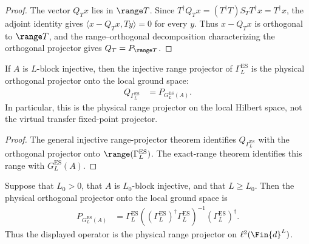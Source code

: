 \begin{proof}
    \leanok
    The vector $Q_Tx$ lies in $\range T$. Since
    $T^\dagger Q_Tx=(T^\dagger T)S_TT^\dagger x=T^\dagger x$, the adjoint identity
    gives $\langle x-Q_Tx,Ty\rangle=0$ for every $y$. Thus $x-Q_Tx$ is
    orthogonal to $\range T$, and the range--orthogonal decomposition
    characterizing the orthogonal projector gives $Q_T=P_{\range T}$.
\end{proof}

\begin{lemma}
    \label{thm:ground_space_map_es_injective_range_projector}
    \leanok
    If $A$ is $L$-block injective, then the injective range projector of
    $\Gamma_L^{\mathrm{ES}}$ is the physical orthogonal projector onto the
    local ground space:
    \begin{align}
        Q_{\Gamma_L^{\mathrm{ES}}}
         & =P_{G_L^{\mathrm{ES}}(A)}.
    \end{align}
    In particular, this is the physical range projector on the local Hilbert
    space, not the virtual transfer fixed-point projector.
\end{lemma}

\begin{proof}
    \leanok
    The general injective range-projector theorem identifies
    $Q_{\Gamma_L^{\mathrm{ES}}}$ with the orthogonal projector onto
    $\range(\Gamma_L^{\mathrm{ES}})$.  The exact-range theorem identifies
    this range with $G_L^{\mathrm{ES}}(A)$.
\end{proof}

\begin{lemma}
    \label{thm:ground_space_es_projection_inverse_gram}
    \leanok
    Suppose that $L_0>0$, that $A$ is $L_0$-block injective, and that
    $L\ge L_0$.  Then the physical orthogonal projector onto the local ground
    space is
    \begin{align}
        P_{G_L^{\mathrm{ES}}(A)}
         & =\Gamma_L^{\mathrm{ES}}
        \left((\Gamma_L^{\mathrm{ES}})^\dagger
        \Gamma_L^{\mathrm{ES}}\right)^{-1}
        (\Gamma_L^{\mathrm{ES}})^\dagger.
    \end{align}
    Thus the displayed operator is the physical range projector on
    $\ell^2(\Fin{d}^{L})$.
\end{lemma}

